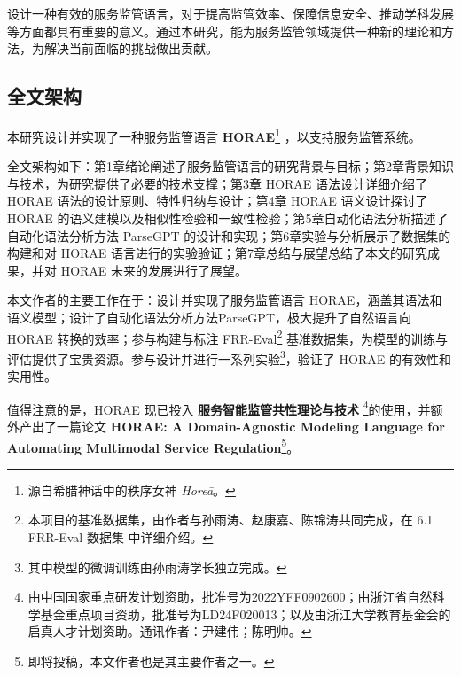 设计一种有效的服务监管语言，对于提高监管效率、保障信息安全、推动学科发展等方面都具有重要的意义。通过本研究，能为服务监管领域提供一种新的理论和方法，为解决当前面临的挑战做出贡献。

\subsection{全文架构}

本研究设计并实现了一种服务监管语言 \textbf{HORAE}\footnote{源自希腊神话中的秩序女神 \textit{Horeā}。} ，以支持服务监管系统。

全文架构如下：第1章绪论阐述了服务监管语言的研究背景与目标；第2章背景知识与技术，为研究提供了必要的技术支撑；第3章 HORAE 语法设计详细介绍了 HORAE 语法的设计原则、特性归纳与设计；第4章 HORAE 语义设计探讨了 HORAE 的语义建模以及相似性检验和一致性检验；第5章自动化语法分析描述了自动化语法分析方法 ParseGPT 的设计和实现；第6章实验与分析展示了数据集的构建和对 HORAE 语言进行的实验验证；第7章总结与展望总结了本文的研究成果，并对 HORAE 未来的发展进行了展望。

本文作者的主要工作在于：设计并实现了服务监管语言 HORAE，涵盖其语法和语义模型；设计了自动化语法分析方法ParseGPT，极大提升了自然语言向 HORAE 转换的效率；参与构建与标注 FRR-Eval\footnote{本项目的基准数据集，由作者与孙雨涛、赵康嘉、陈锦涛共同完成，在 6.1 FRR-Eval 数据集 中详细介绍。} 基准数据集，为模型的训练与评估提供了宝贵资源。参与设计并进行一系列实验\footnote{其中模型的微调训练由孙雨涛学长独立完成。}，验证了 HORAE 的有效性和实用性。

值得注意的是，HORAE 现已投入 \textbf{服务智能监管共性理论与技术} \footnote{由中国国家重点研发计划资助，批准号为2022YFF0902600；由浙江省自然科学基金重点项目资助，批准号为LD24F020013；以及由浙江大学教育基金会的启真人才计划资助。通讯作者：尹建伟；陈明帅。}的使用，并额外产出了一篇论文 \textbf{ HORAE: A Domain-Agnostic Modeling Language
for Automating Multimodal Service Regulation}\footnote{即将投稿，本文作者也是其主要作者之一。}。